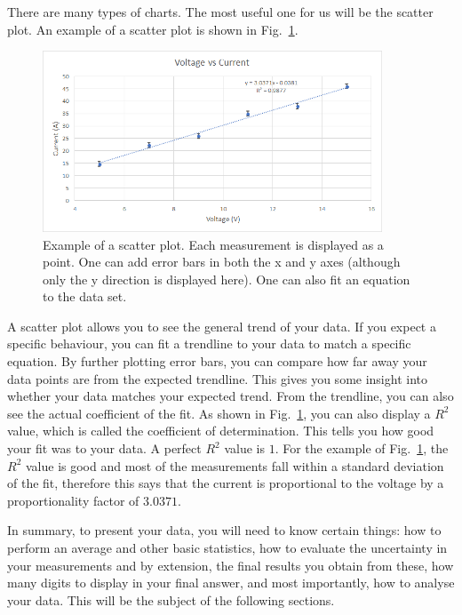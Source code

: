 \documentclass[12pt]{report}
\begin{document}
There are many types of charts. The most useful one for us will be the scatter plot. An example of a scatter plot is shown in Fig.~\ref{Fig:Example-Scatter}.
\begin{figure}[h]
\centering
\includegraphics[width=0.9\textwidth]{intro-example-scatter}
\caption{Example of a scatter plot. Each measurement is displayed as a point. One can add error bars in both the x and y axes (although only the y direction is displayed here). One can also fit an equation to the data set.}
\label{Fig:Example-Scatter}
\end{figure}

A scatter plot allows you to see the general trend of your data. If you expect a specific behaviour, you can fit a trendline to your data to match a specific equation. By further plotting error bars, you can compare how far away your data points are from the expected trendline. This gives you some insight into whether your data matches your expected trend. From the trendline, you can also see the actual coefficient of the fit. As shown in Fig.~\ref{Fig:Example-Scatter}, you can also display a $R^2$ value, which is called the coefficient of determination. This tells you how good your fit was to your data. A perfect $R^2$ value is $1$. For the example of Fig.~\ref{Fig:Example-Scatter}, the $R^2$ value is good and most of the measurements fall within a standard deviation of the fit, therefore this says that the current is proportional to the voltage by a proportionality factor of $3.0371$. 

In summary, to present your data, you will need to know certain things: how to perform an average and other basic statistics, how to evaluate the uncertainty in your measurements and by extension, the final results you obtain from these, how many digits to display in your final answer, and most importantly, how to analyse your data. This will be the subject of the following sections.
\end{document}
